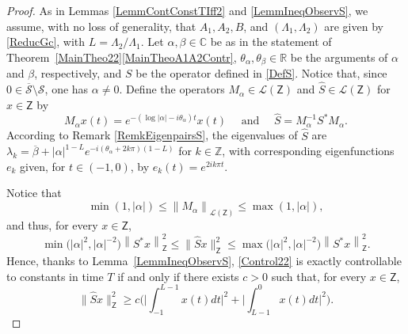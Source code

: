 \documentclass[10pt]{amsart}
\theoremstyle{plain}
\theoremstyle{definition}
\newcommand{\norm}[1]{\left\lVert #1\right\lVert}
\newcommand{\abs}[1]{\left\lvert #1\right \rvert}
\newcommand{\bnorm}[1]{\bigl\lVert #1\bigr\lVert}
\newcommand{\bgabs}[1]{\biggl\lvert #1\biggr \rvert}
\begin{document}
\begin{proof}
As in Lemmas \ref{LemmContConstTIff2} and \ref{LemmIneqObservS}, we assume, with no loss of generality, that $A_1, A_2, B$, and $(\Lambda_1, \Lambda_2)$ are given by \eqref{ReducGc}, with $L = \Lambda_2 / \Lambda_1$. Let $\alpha, \beta \in \mathbb C$ be as in the statement of Theorem~\ref{MainTheo22}\eqref{MainTheoA1A2Contr}, $\theta_\alpha, \theta_\beta \in \mathbb R$ be the arguments of $\alpha$ and $\beta$, respectively, and $S$ be the operator defined in \eqref{DefS}. Notice that, since $0 \in \overline{\mathcal S}\setminus \mathcal S$, one has $\alpha \neq 0$. Define the operators $M_\alpha \in \mathcal L(\mathsf Z)$ and $\widehat S \in \mathcal L(\mathsf Z)$ for $x \in \mathsf Z$ by
\[M_\alpha x(t) = e^{-(\log\abs{\alpha} - i \theta_\alpha) t} x(t) \quad \text{ and } \quad \widehat S = M_{\alpha}^{-1} S^\ast M_\alpha.\]
According to Remark \ref{RemkEigenpairsS}, the eigenvalues of $\widehat S$ are $\lambda_k = \overline\beta + \abs{\alpha}^{1 - L} e^{- i (\theta_\alpha + 2 k \pi)(1 - L)}$ for $k \in \mathbb Z$, with corresponding eigenfunctions $e_k$ given, for $t \in (-1, 0)$, by $e_k(t) = e^{2 i k \pi t}$.

Notice that
\[
\min(1, \abs{\alpha}) \leq \norm{M_\alpha}_{\mathcal L(\mathsf Z)} \leq \max(1, \abs{\alpha}),
\]
and thus, for every $x \in \mathsf Z$,
\[
\min\bigl(\abs{\alpha}^2, \abs{\alpha}^{-2}\bigr) \norm{S^\ast x}_{\mathsf Z}^2 \leq \bnorm{\widehat S x}_{\mathsf Z}^2 \leq \max\bigl(\abs{\alpha}^2, \abs{\alpha}^{-2}\bigr) \norm{S^\ast x}_{\mathsf Z}^2.
\]
Hence, thanks to Lemma~\ref{LemmIneqObservS}, \eqref{Control22} is exactly controllable to constants in time $T$ if and only if there exists $c > 0$ such that, for every $x \in \mathsf Z$,
\begin{equation}
\label{IneqObservSHat}
\bnorm{\widehat S x}_{\mathsf Z}^2 \geq c \biggl(\bgabs{\int_{-1}^{L-1} x(t) dt}^2 + \bgabs{\int_{L-1}^{0} x(t) dt}^2\biggr).
\end{equation}


\end{proof}
\end{document}
